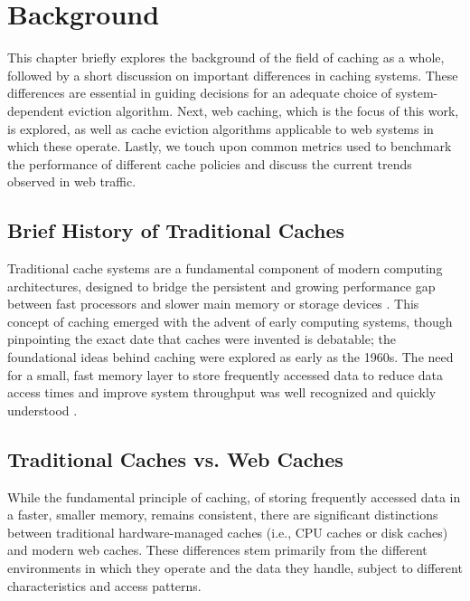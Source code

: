 \chapter{Background}\label{chapter:background}

This chapter briefly explores the background of the field of caching as a whole, followed by a short discussion on important differences in caching systems. These differences are essential in guiding decisions for an adequate choice of system-dependent eviction algorithm. Next, web caching, which is the focus of this work, is explored, as well as cache eviction algorithms applicable to web systems in which these operate. Lastly, we touch upon common metrics used to benchmark the performance of different cache policies and discuss the current trends observed in web traffic.

\section{Brief History of Traditional Caches}

Traditional cache systems are a fundamental component of modern computing architectures, designed to bridge the persistent and growing performance gap between fast processors and slower main memory or storage devices \cite{belady-ibm-1966}. This concept of caching emerged with the advent of early computing systems, though pinpointing the exact date that caches were invented is debatable; the foundational ideas behind caching were explored as early as the 1960s. The need for a small, fast memory layer to store frequently accessed data to reduce data access times and improve system throughput was well recognized and quickly understood \cite{belady-ibm-1966}.


\section{Traditional Caches vs. Web Caches}


While the fundamental principle of caching, of storing frequently accessed data in a faster, smaller memory, remains consistent, there are significant distinctions between traditional hardware-managed caches (i.e., CPU caches or disk caches) and modern web caches. These differences stem primarily from the different environments in which they operate and the data they handle, subject to different characteristics and access patterns.

